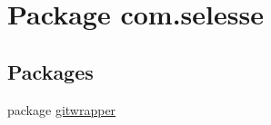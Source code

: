 \hypertarget{namespacecom_1_1selesse}{}\section{Package com.\+selesse}
\label{namespacecom_1_1selesse}
\subsection*{Packages}
\begin{DoxyCompactItemize}
\item 
package \hyperlink{namespacecom_1_1selesse_1_1gitwrapper}{gitwrapper}
\end{DoxyCompactItemize}
